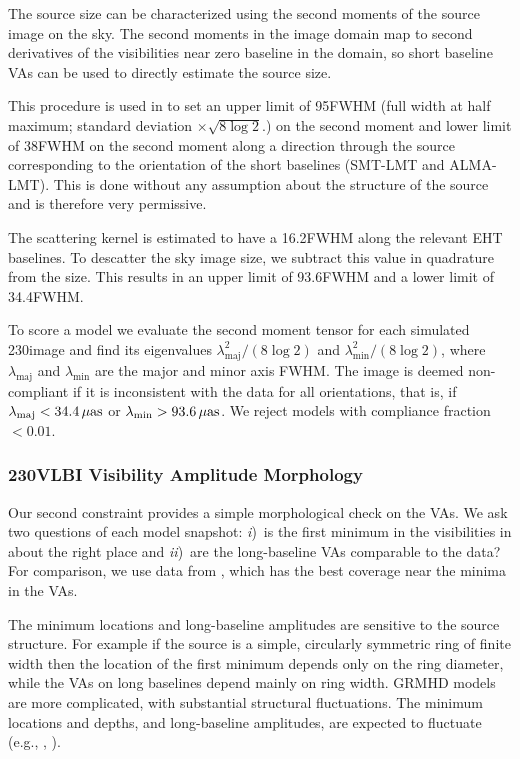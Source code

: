 The source size can be characterized using the second moments of the
source image on the sky.
The second moments in the image domain map to second derivatives of
the visibilities near zero baseline in the \uv domain, so short
baseline VAs can be used to directly estimate the source size.

This procedure is used in  to set an upper limit
of 95\uas FWHM (full width at half maximum; standard deviation $\times \sqrt{8\log{2}}$.) on the second moment and lower limit of 38\uas FWHM on the second moment along a direction
through the source corresponding to the orientation of the short
baselines (SMT-LMT and ALMA-LMT).  This is done without any assumption
about the structure of the source and is therefore very permissive.

The scattering kernel is estimated to have a 16.2\uas FWHM along the
relevant EHT baselines.
To descatter the sky image size, we subtract this value in quadrature
from the size.
This results in an upper limit of 93.6\uas FWHM and a lower limit of
34.4\uas FWHM.

To score a model we evaluate the second moment tensor for each simulated 230\GHz image
and find its eigenvalues $\lambda_\mathrm{maj}^2/(8\log 2)$ and $\lambda_\mathrm{min}^2/(8\log
2)$, where $\lambda_\mathrm{maj}$ and $\lambda_\mathrm{min}$ are the major and minor axis
FWHM.
The image is deemed non-compliant if it is inconsistent with the data for
all orientations, that is, if $\lambda_\mathrm{maj} < 34.4\,\mathrm{\mu as}$ or
$\lambda_\mathrm{min} > 93.6\,\mathrm{\mu as}$.
We reject models with compliance fraction $< 0.01$.


\subsubsection{230\GHz VLBI Visibility Amplitude Morphology}

Our second constraint provides a simple morphological check on the
VAs.  We ask two questions of each model snapshot: \emph{i})~is the first
minimum in the visibilities in about the right place and
\emph{ii})~are the long-baseline VAs comparable to the data?
For comparison, we use data from \aprilvii, which has the best \uv
coverage near the minima in the VAs.

The minimum locations and long-baseline amplitudes are sensitive to the
source structure.
For example if the source is a simple, circularly symmetric ring of
finite width then the location of the first minimum depends only on
the ring diameter, while the VAs on long baselines depend mainly on
ring width.
GRMHD models are more complicated, with substantial structural
fluctuations.
The minimum locations and depths, and long-baseline amplitudes, are
expected to fluctuate (e.g., \citealt{2018ApJ...856..163M},
).

